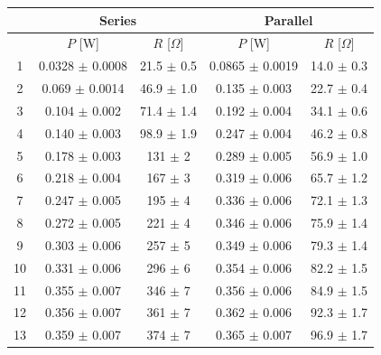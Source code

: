 \documentclass{article}
\begin{document}
{\begin{table}
    \centering
    \begin{tabular}{ccc||cc}
        \toprule
           & \multicolumn{2}{c||}{Series} & \multicolumn{2}{c}{Parallel}                                                      \\
        \midrule
           & $P$ [W]                      & $R$ [$\Omega$]                & $P$ [W]             & $R$ [$\Omega$]              \\
        \midrule
        1  & 0.0328 $\pm$ 0.0008          & 21.5                $\pm$ 0.5 & 0.0865 $\pm$ 0.0019 & 14.0              $\pm$ 0.3 \\
        2  & 0.069  $\pm$ 0.0014          & 46.9                $\pm$ 1.0 & 0.135  $\pm$ 0.003  & 22.7              $\pm$ 0.4 \\
        3  & 0.104  $\pm$ 0.002           & 71.4                $\pm$ 1.4 & 0.192  $\pm$ 0.004  & 34.1              $\pm$ 0.6 \\
        4  & 0.140  $\pm$ 0.003           & 98.9                $\pm$ 1.9 & 0.247  $\pm$ 0.004  & 46.2              $\pm$ 0.8 \\
        5  & 0.178  $\pm$ 0.003           & 131                 $\pm$ 2   & 0.289  $\pm$ 0.005  & 56.9              $\pm$ 1.0 \\
        6  & 0.218  $\pm$ 0.004           & 167                 $\pm$ 3   & 0.319  $\pm$ 0.006  & 65.7              $\pm$ 1.2 \\
        7  & 0.247  $\pm$ 0.005           & 195                 $\pm$ 4   & 0.336  $\pm$ 0.006  & 72.1              $\pm$ 1.3 \\
        8  & 0.272  $\pm$ 0.005           & 221                 $\pm$ 4   & 0.346  $\pm$ 0.006  & 75.9              $\pm$ 1.4 \\
        9  & 0.303  $\pm$ 0.006           & 257                 $\pm$ 5   & 0.349  $\pm$ 0.006  & 79.3              $\pm$ 1.4 \\
        10 & 0.331  $\pm$ 0.006           & 296                 $\pm$ 6   & 0.354  $\pm$ 0.006  & 82.2              $\pm$ 1.5 \\
        11 & 0.355  $\pm$ 0.007           & 346                 $\pm$ 7   & 0.356  $\pm$ 0.006  & 84.9              $\pm$ 1.5 \\
        12 & 0.356  $\pm$ 0.007           & 361                 $\pm$ 7   & 0.362  $\pm$ 0.006  & 92.3              $\pm$ 1.7 \\
        13 & 0.359  $\pm$ 0.007           & 374                 $\pm$ 7   & 0.365  $\pm$ 0.007  & 96.9              $\pm$ 1.7 \\

\end{tabular}
\end{table}}
\end{document}
